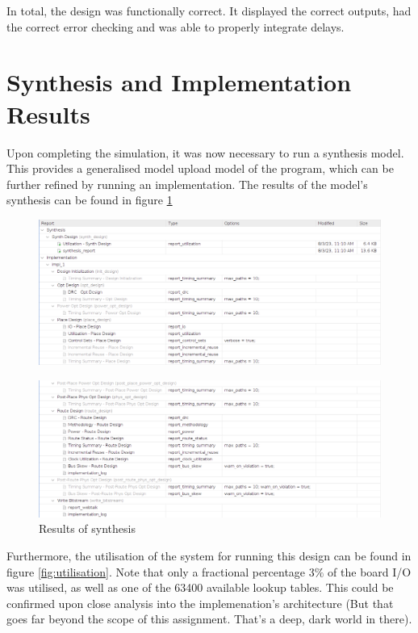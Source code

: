 \documentclass[12pt,a4paper]{article}
\begin{document}
In total, the design was functionally correct. It displayed the correct outputs, had the correct error checking and was able to properly integrate delays.

\section{Synthesis and Implementation Results}

Upon completing the simulation, it was now necessary to run a synthesis model. This provides a generalised model upload model of the program, which can be further refined by running an implementation. The results of the model's synthesis can be found in figure \ref{fig:synthesis}

\begin{figure}[H]
    \centering
    \includegraphics[scale=0.25]{images/synthesis_results_1.png}
\end{figure}
\begin{figure}[H]
    \centering
    \includegraphics[scale=0.25]{images/synthesis_results_2.png}
    \caption{Results of synthesis}
    \label{fig:synthesis}
\end{figure}

Furthermore, the utilisation of the system for running this design can be found in figure \ref{fig:utilisation}. Note that only a fractional percentage 3$\%$ of the board I/O was utilised, as well as one of the 63400 available lookup tables. This could be confirmed upon close analysis into the implemenation's architecture (But that goes far beyond the scope of this assignment. That's a deep, dark world in there).
\end{document}
